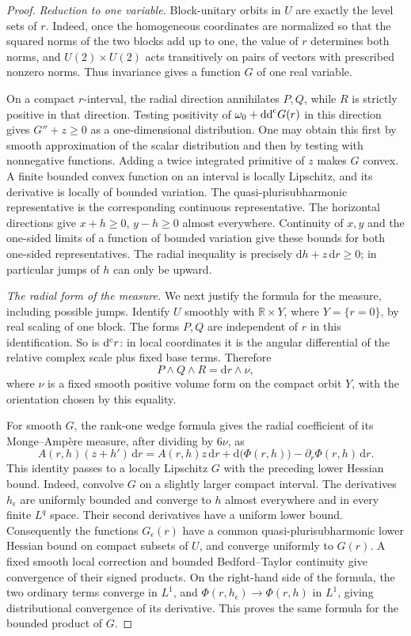 \begin{proof}
\emph{Reduction to one variable.} Block-unitary orbits in $U$ are exactly the level sets of $r$. Indeed, once the homogeneous coordinates are normalized so that the squared norms of the two blocks add up to one, the value of $r$ determines both norms, and $U(2)\times U(2)$ acts transitively on pairs of vectors with prescribed nonzero norms. Thus invariance gives a function $G$ of one real variable.

On a compact $r$-interval, the radial direction annihilates $P,Q$, while $R$ is strictly positive in that direction. Testing positivity of $\omega_0+\mathrm{dd}^{\mathrm{c}} G(r)$ in this direction gives $G''+z\geq0$ as a one-dimensional distribution. One may obtain this first by smooth approximation of the scalar distribution and then by testing with nonnegative functions. Adding a twice integrated primitive of $z$ makes $G$ convex. A finite bounded convex function on an interval is locally Lipschitz, and its derivative is locally of bounded variation. The quasi-plurisubharmonic representative is the corresponding continuous representative. The horizontal directions give $x+h\geq0$, $y-h\geq0$ almost everywhere. Continuity of $x,y$ and the one-sided limits of a function of bounded variation give these bounds for both one-sided representatives. The radial inequality is precisely $\mathrm{d}h+z\,\mathrm{d}r\geq0$; in particular jumps of $h$ can only be upward.

\emph{The radial form of the measure.} We next justify the formula for the measure, including possible jumps. Identify $U$ smoothly with $\mathbb R\times Y$, where $Y=\{r=0\}$, by real scaling of one block. The forms $P,Q$ are independent of $r$ in this identification. So is $\mathrm d^{\mathrm c} r$: in local coordinates it is the angular differential of the relative complex scale plus fixed base terms. Therefore
\[
 P\wedge Q\wedge R=\mathrm{d}r\wedge\nu,
\]
where $\nu$ is a fixed smooth positive volume form on the compact orbit $Y$, with the orientation chosen by this equality.

For smooth $G$, the rank-one wedge formula gives the radial coefficient of its Monge--Amp\`ere measure, after dividing by $6\nu$, as
\[
 A(r,h)(z+h')\,\mathrm{d}r
 =A(r,h)z\,\mathrm{d}r+\mathrm{d}\bigl(\Phi(r,h)\bigr)
                         -\partial_r\Phi(r,h)\,\mathrm{d}r.
\]
This identity passes to a locally Lipschitz $G$ with the preceding lower Hessian bound. Indeed, convolve $G$ on a slightly larger compact interval. The derivatives $h_\epsilon$ are uniformly bounded and converge to $h$ almost everywhere and in every finite $L^q$ space. Their second derivatives have a uniform lower bound. Consequently the functions $G_\epsilon(r)$ have a common quasi-plurisubharmonic lower Hessian bound on compact subsets of $U$, and converge uniformly to $G(r)$. A fixed smooth local correction and bounded Bedford--Taylor continuity give convergence of their signed products. On the right-hand side of the formula, the two ordinary terms converge in $L^1$, and $\Phi(r,h_\epsilon)\to\Phi(r,h)$ in $L^1$, giving distributional convergence of its derivative. This proves the same formula for the bounded product of $G$.


\end{proof}
